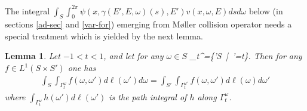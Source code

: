 \documentclass[a4paper,12pt,oneside,reqno]{amsart}
\def\[#1\]{\begin{align*}#1\end{align*}}
\def\[#1\]{\begin{align*}#1\end{align*}}
\theoremstyle{theorem}
\newtheorem{lemma}[theorem]{Lemma}
\begin{document}
The integral $\int_S\int_0^{2\pi}\psi(x,\gamma(E',E,\omega)(s),E')v(x,\omega,E)ds d\omega$ below (in sections \ref{ad-sec} and \ref{var-for}) emerging from M\o ller collision operator needs a special treatment which is yielded by the next lemma.

\begin{lemma}\label{le-m:0}
Let $-1<t<1$, and let for any $\omega\in S$ 
\[
\Gamma_{t}^\omega=\{\omega'\in S\ |\ \omega\cdot\omega'=t\}.
\]
Then for any $f\in L^1(S\times S')$ one has
\begin{align}\label{eq:le-m:0}
\int_S \int_{\Gamma_t^\omega} f(\omega,\omega')d\ell(\omega') d\omega
=
\int_{S'} \int_{\Gamma_t^{\omega'}} f(\omega,\omega')d\ell(\omega) d\omega'
\end{align}
where $\int_{\Gamma_t^\omega} h(\omega')d\ell(\omega')$ is the path integral of $h$ along $\Gamma_t^\omega$.
\end{lemma}
\end{document}
